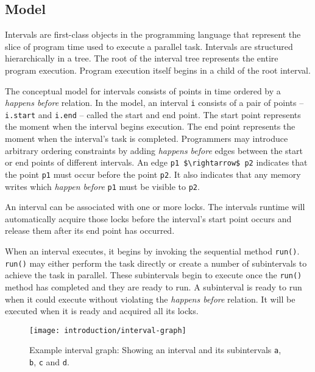 \subsection{Model}
\label{sec:intro-intervals-model}

Intervals are first-class objects in the programming language that
represent the slice of program time used to execute a parallel
task. Intervals are structured hierarchically in a tree. The root of
the interval tree represents the entire program execution. Program
execution itself begins in a child of the root interval.

The conceptual model for intervals consists of points in time ordered
by a \emph{happens before} relation. In the model, an interval
\lstinline|i| consists of a pair of points -- \lstinline|i.start| and
\lstinline|i.end| -- called the start and end point. The start point
represents the moment when the interval begins execution. The end
point represents the moment when the interval's task is
completed. Programmers may introduce arbitrary ordering constraints by
adding \emph{happens before} edges between the start or end points of
different intervals. An edge \lstinline|p1 $\rightarrow$ p2| indicates
that the point \lstinline|p1| must occur before the point
\lstinline|p2|. It also indicates that any memory writes which
\emph{happen before} \lstinline|p1| must be visible to \lstinline|p2|.

An interval can be associated with one or more locks. The intervals
runtime will automatically acquire those locks before the interval's
start point occurs and release them after its end point has occurred.

When an interval executes, it begins by invoking the sequential method
\lstinline|run()|. \lstinline|run()| may either perform the task
directly or create a number of subintervals to achieve the task in
parallel. These subintervals begin to execute once the
\lstinline|run()| method has completed and they are ready to run. A
subinterval is ready to run when it could execute without violating
the \emph{happens before} relation. It will be executed when it is
ready and acquired all its locks.

\begin{figure}[htb]
  \centering
  \texttt{[image: introduction/interval-graph]}
  \caption[Example interval graph]{Example interval graph: Showing an
    interval and its subintervals \lstinline|a|, \lstinline|b|,
    \lstinline|c| and \lstinline|d|.}
  \label{fig:interval-graph}
\end{figure}

